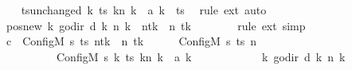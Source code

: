 \begin{isabellebody}
\ \ \isamarkupfalse%
\ ts{\isacharunderscore}{\kern0pt}unchanged{\isacharcolon}{\kern0pt}\ {\isachardoublequoteopen}{\isacharparenleft}{\kern0pt}{\isasymlambda}k{\isachardot}{\kern0pt}\ {\isacharparenleft}{\kern0pt}ts\ k{\isacharparenright}{\kern0pt}{\isacharparenleft}{\kern0pt}n\ k\ {\isacharcolon}{\kern0pt}{\isacharequal}{\kern0pt}\ {\isacharquery}{\kern0pt}a\ k{\isacharparenright}{\kern0pt}{\isacharparenright}{\kern0pt}\ {\isacharequal}{\kern0pt}\ ts{\isachardoublequoteclose}\ \isamarkupfalse%
\ {\isacharparenleft}{\kern0pt}rule\ ext{\isacharparenright}{\kern0pt}\ auto\isanewline
\ \ \isamarkupfalse%
\ pos{\isacharunderscore}{\kern0pt}new{\isacharcolon}{\kern0pt}\ {\isachardoublequoteopen}{\isacharparenleft}{\kern0pt}{\isasymlambda}k{\isachardot}{\kern0pt}\ go{\isacharunderscore}{\kern0pt}dir\ {\isacharparenleft}{\kern0pt}{\isacharquery}{\kern0pt}d\ k{\isacharparenright}{\kern0pt}\ {\isacharparenleft}{\kern0pt}n\ k{\isacharparenright}{\kern0pt}{\isacharparenright}{\kern0pt}\ {\isacharequal}{\kern0pt}\ n{\isacharparenleft}{\kern0pt}tk\ {\isacharcolon}{\kern0pt}{\isacharequal}{\kern0pt}\ n\ tk\ {\isacharminus}{\kern0pt}\ {}{\isacharparenright}{\kern0pt}{\isachardoublequoteclose}\isanewline
\ \ \ \ \isamarkupfalse%
\ {\isacharparenleft}{\kern0pt}rule\ ext{\isacharparenright}{\kern0pt}\ simp\isanewline
\ \ \isamarkupfalse%
\ {\isacharquery}{\kern0pt}c{\isacharprime}{\kern0pt}{\isacharprime}{\kern0pt}\ {\isacharequal}{\kern0pt}\ {\isachardoublequoteopen}Config\isactrlsub M\ {\isacharquery}{\kern0pt}s{\isacharprime}{\kern0pt}\ ts\ {\isacharparenleft}{\kern0pt}n{\isacharparenleft}{\kern0pt}tk\ {\isacharcolon}{\kern0pt}{\isacharequal}{\kern0pt}\ n\ tk\ {\isacharminus}{\kern0pt}\ {}{\isacharparenright}{\kern0pt}{\isacharparenright}{\kern0pt}{\isachardoublequoteclose}\isanewline
\ \ \isamarkupfalse%
\ {\isachardoublequoteopen}{\isacharparenleft}{\kern0pt}Config\isactrlsub M\ {\isacharquery}{\kern0pt}s\ ts\ n{\isacharcomma}{\kern0pt}\isanewline
\ \ \ \ \ \ \ \ \ \ Config\isactrlsub M\ {\isacharquery}{\kern0pt}s{\isacharprime}{\kern0pt}\ {\isacharparenleft}{\kern0pt}{\isasymlambda}k{\isachardot}{\kern0pt}\ {\isacharparenleft}{\kern0pt}ts\ k{\isacharparenright}{\kern0pt}{\isacharparenleft}{\kern0pt}n\ k\ {\isacharcolon}{\kern0pt}{\isacharequal}{\kern0pt}\ {\isacharquery}{\kern0pt}a\ k{\isacharparenright}{\kern0pt}{\isacharparenright}{\kern0pt}\isanewline
\ \ \ \ \ \ \ \ \ \ \ \ {\isacharparenleft}{\kern0pt}{\isasymlambda}k{\isachardot}{\kern0pt}\ go{\isacharunderscore}{\kern0pt}dir\ {\isacharparenleft}{\kern0pt}{\isacharquery}{\kern0pt}d\ k{\isacharparenright}{\kern0pt}\ {\isacharparenleft}{\kern0pt}n\ k{\isacharparenright}{\kern0pt}{\isacharparenright}{\kern0pt}{\isacharparenright}{\kern0pt}\isanewline

\end{isabellebody}
